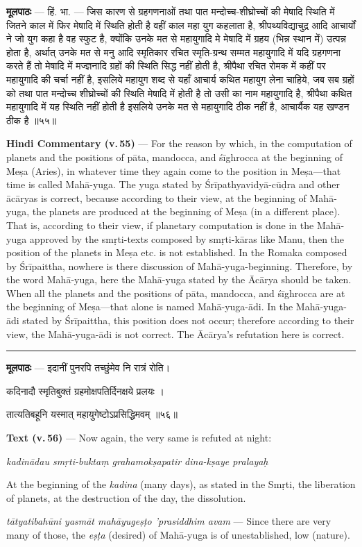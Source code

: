 \documentclass[11pt,a4paper]{article}
\newcommand{\skt}[1]{{\devanagarifont\color{sktcolor} #1}}
\newenvironment{bilingual}{%
  \par\noindent
  \begin{minipage}[t]{0.47\textwidth}%
}{%
  \par\end{minipage}%
}
\newcommand{\rightcol}{%
  \par\end{minipage}%
  \hfill
  \begin{minipage}[t]{0.47\textwidth}%
}
\begin{document}
\begin{bilingual}
\textbf{मूलपाठः} --- \skt{हिं. भा. --- जिस कारण से ग्रहगणनाओं तथा पात मन्दोच्च-शीघ्रोच्चों की मेषादि स्थिति में जितने काल में फिर मेषादि में स्थिति होती है वहीं काल महा युग कहलाता है, श्रीपथ्यविद्याचुद्र आदि आचार्यों ने जो युग कहा है वह स्फुट है, क्योंकि उनके मत से महायुगादि मे मेषादि में ग्रहय (भिन्न स्थान में) उत्पन्न होता है, अर्थात् उनके मत से मनु आदि स्मृतिकार रचित स्मृति-ग्रन्थ सम्मत महायुगादि में यदि ग्रहगणना करते हैं तो मेषादि में मज्ज्ञनादि ग्रहों की स्थिति सिद्ध नहीं होती है, श्रीपैथा रचित रोमक में कहीं पर महायुगादि की चर्चा नहीं है, इसलिये महायुग शब्द से यहाँ आचार्य कथित महायुग लेना चाहिये, जब सब ग्रहों को तथा पात मन्दोच्च शीघ्रोच्चों की स्थिति मेषादि में होती है तो उसी का नाम महायुगादि है, श्रीपैथा कथित महायुगादि में यह स्थिति नहीं होती है इसलिये उनके मत से महायुगादि ठीक नहीं है, आचार्यैक यह खण्डन ठीक है} ॥५५॥
\rightcol
\textbf{Hindi Commentary (v.\,55)} --- For the reason by which, in the computation of planets and the positions of pāta, mandocca, and śīghrocca at the beginning of Meṣa (Aries), in whatever time they again come to the position in Meṣa---that time is called Mahā-yuga. The yuga stated by Śrīpathyavidyā-cūḍra and other ācāryas is correct, because according to their view, at the beginning of Mahā-yuga, the planets are produced at the beginning of Meṣa (in a different place). That is, according to their view, if planetary computation is done in the Mahā-yuga approved by the smṛti-texts composed by smṛti-kāras like Manu, then the position of the planets in Meṣa etc. is not established. In the Romaka composed by Śrīpaittha, nowhere is there discussion of Mahā-yuga-beginning. Therefore, by the word Mahā-yuga, here the Mahā-yuga stated by the Ācārya should be taken. When all the planets and the positions of pāta, mandocca, and śīghrocca are at the beginning of Meṣa---that alone is named Mahā-yuga-ādi. In the Mahā-yuga-ādi stated by Śrīpaittha, this position does not occur; therefore according to their view, the Mahā-yuga-ādi is not correct. The Ācārya's refutation here is correct.
\end{bilingual}

\medskip
\noindent\rule{\textwidth}{0.4pt}

\begin{bilingual}
\textbf{मूलपाठः} --- \skt{इदानीं पुनरपि तच्छुंमेव नि रात्रं रोति}।

\skt{कदिनादौ स्मृतिबुक्तं ग्रहमोक्षपतिर्दिनक्षये प्रलयः} ।

\skt{तात्यतिबहूनि यस्मात् महायुगेष्टोऽप्रसिद्धिमवम्} ॥५६॥
\rightcol
\textbf{Text (v.\,56)} --- Now again, the very same is refuted at night:

\textit{kadinādau smṛti-buktaṃ grahamokṣapatir dina-kṣaye pralayaḥ}

At the beginning of the \textit{kadina} (many days), as stated in the Smṛti, the liberation of planets, at the destruction of the day, the dissolution.

\textit{tātyatibahūni yasmāt mahāyugeṣṭo 'prasiddhim avam} --- Since there are very many of those, the \textit{eṣṭa} (desired) of Mahā-yuga is of unestablished, low (nature).
\end{bilingual}
\end{document}
